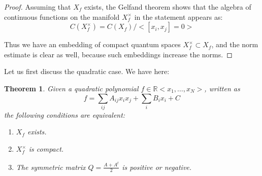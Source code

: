 \documentclass[12pt]{amsbook}
\newtheorem{theorem}{Theorem}[chapter]
\begin{document}
\begin{proof}
Assuming that $X_f$ exists, the Gelfand theorem shows that the algebra of continuous functions on the manifold $X_f^\times$ in the statement appears as:
$$C(X_f^\times)=C(X_f)\Big/\Big<[x_i,x_j]=0\Big>$$

Thus we have an embedding of compact quantum spaces $X_f^\times\subset X_f$, and the norm estimate is clear as well, because such embeddings increase the norms.
\end{proof}

Let us first discuss the quadratic case. We have here:


\begin{theorem}
Given a quadratic polynomial $f\in\mathbb R<x_1,\ldots,x_N>$, written as
$$f=\sum_{ij}A_{ij}x_ix_j+\sum_iB_ix_i+C$$
the following conditions are equivalent:
\begin{enumerate}
\item $X_f$ exists.

\item $X_f^\times$ is compact.

\item The symmetric matrix $Q=\frac{A+A^t}{2}$ is positive or negative.
\end{enumerate}
\end{theorem}
\end{document}
